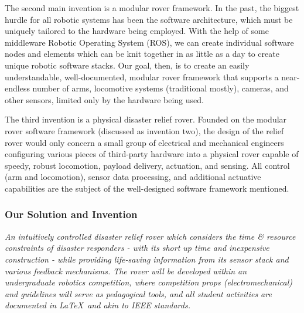 \documentclass[a4paper, 10pt]{article}
\begin{document}
The second main invention is a modular rover framework. In the past, the biggest hurdle for all robotic systems has been the software architecture, which must be uniquely tailored to the hardware being employed. With the help of some middleware Robotic Operating System (ROS), we can create individual software nodes and elements which can be knit together in as little as a day to create unique robotic software stacks. Our goal, then, is to create an easily understandable, well-documented, modular rover framework that supports a near-endless number of arms, locomotive systems (traditional mostly), cameras, and other sensors, limited only by the hardware being used.	

The third invention is a physical disaster relief rover. Founded on the modular rover software framework (discussed as invention two), the design of the relief rover would only concern a small group of electrical and mechanical engineers configuring various pieces of third-party hardware into a physical rover capable of speedy, robust locomotion, payload delivery, actuation, and sensing. All control (arm and locomotion), sensor data processing, and additional actuative capabilities are the subject of the well-designed software framework mentioned.

		\subsubsection*{Our Solution and Invention}
		\textit{An intuitively controlled disaster relief rover which considers the time \& resource constraints of disaster responders - with its short up time and inexpensive construction - while providing life-saving information from its sensor stack and various feedback mechanisms. The rover will be developed within an undergraduate robotics competition, where competition props (electromechanical) and guidelines will serve as pedagogical tools, and all student activities are documented in \LaTeX\ and akin to IEEE standards.}		
		
\end{document}
